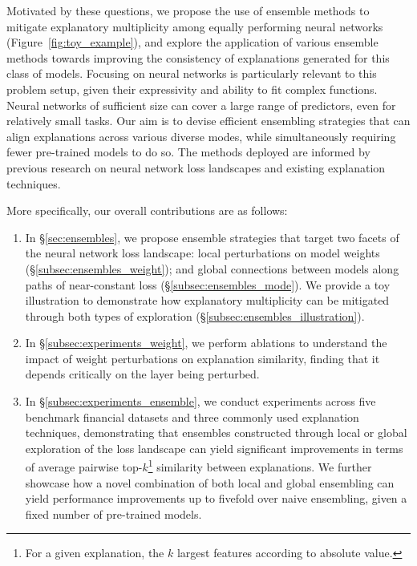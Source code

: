 Motivated by these questions, we propose the use of ensemble methods to mitigate explanatory multiplicity among equally performing neural networks (Figure~\ref{fig:toy_example}), and explore the application of various ensemble methods towards improving the consistency of explanations generated for this class of models. Focusing on neural networks is particularly relevant to this problem setup, given their expressivity and ability to fit complex functions. Neural networks of sufficient size can cover a large range of predictors, even for relatively small tasks. Our aim is to devise efficient ensembling strategies that can align explanations across various diverse modes, while simultaneously requiring fewer pre-trained models to do so. The methods deployed are informed by previous research on neural network loss landscapes and existing explanation techniques.\vspace{-1pt}

More specifically, our overall contributions are as follows:\vspace{-1pt}

\begin{enumerate}
    \item In \S\ref{sec:ensembles}, we propose ensemble strategies that target two facets of the neural network loss landscape: local perturbations on model weights (\S\ref{subsec:ensembles_weight}); and global connections between models along paths of near-constant loss (\S\ref{subsec:ensembles_mode}). We provide a toy illustration to demonstrate how explanatory multiplicity can be mitigated through both types of exploration (\S\ref{subsec:ensembles_illustration}).
    \item In \S\ref{subsec:experiments_weight}, we perform ablations to understand the impact of weight perturbations on explanation similarity, finding that it depends critically on the layer being perturbed. %
    \item In \S\ref{subsec:experiments_ensemble}, we conduct experiments across five benchmark financial datasets and three commonly used explanation techniques, demonstrating that ensembles constructed through local or global exploration of the loss landscape can yield significant improvements in terms of average pairwise top-$k$\footnote{For a given explanation, the $k$ largest features according to absolute value.} similarity between explanations. We further showcase how a novel combination of both local and global ensembling can yield performance improvements up to fivefold over naive ensembling, given a fixed number of pre-trained models.%
\end{enumerate}\vspace{-1pt}

